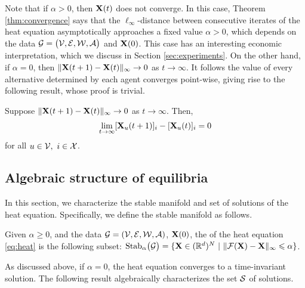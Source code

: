 \documentclass[letterpaper, 10 pt, conference]{ieeeconf}
\begin{document}
Note that if $\alpha > 0$, then $\mathbf{X}(t)$ does not converge. In this case, Theorem \ref{thm:convergence} says that the $\ell_\infty$-distance between consecutive iterates of the heat equation asymptotically approaches a fixed value $\alpha > 0$, which depends on the data $\mathcal{G} = \bigl(\mathcal{V},\mathcal{E},\mathcal{W},\mathcal{A} \bigr)$ and $\mathbf{X}(0)$. This case has an interesting economic interpretation, which we discuss in Section \ref{sec:experiments}.
On the other hand, if $\alpha = 0$, then $\| \mathbf{X}(t+1) - \mathbf{X}(t) \|_{\infty} \to 0$ as $t \to \infty$. It follows the value of every alternative determined by each agent converges point-wise, giving rise to the following result, whose proof is trivial.
\begin{corollary} \label{cor:converge}
    Suppose $\| \mathbf{X}(t+1) - \mathbf{X}(t) \|_{\infty} \to 0$ as $t \to \infty$. Then,
    \begin{align*}
        \lim_{t \to \infty} [\mathbf{X}_u(t+1)]_i - [\mathbf{X}_u(t)]_i = 0
    \end{align*}
    for all $u \in \mathcal{V},~i \in \mathcal{X}$.
\end{corollary}%

\subsection{Algebraic structure of equilibria}
\label{sec:semimod}

In this section, we characterize the stable manifold and set of solutions of the heat equation. Specifically, we define the stable manifold as follows.

\begin{definition} \label{def:stable-manifold}
    Given $\alpha\geq0$, and the data $\mathcal{G} = (\mathcal{V},\mathcal{E},\mathcal{W},\mathcal{A})$, $\mathbf{X}(0)$, the  of the heat equation \eqref{eq:heat} is the following subset: $\mathrm{Stab}_{\alpha}\bigl(\mathcal{G}\bigr) = \{ \mathbf{X} \in (\mathbb{R}^{d})^N~\vert~ \| \mathcal{F}(\mathbf{X}) - \mathbf{X} \|_{\infty} \leqslant \alpha \}$.
\end{definition}

As discussed above, if $\alpha = 0$, the heat equation converges to a time-invariant solution.
The following result algebraically characterizes the set $\mathcal{S}$ of solutions.
\end{document}
